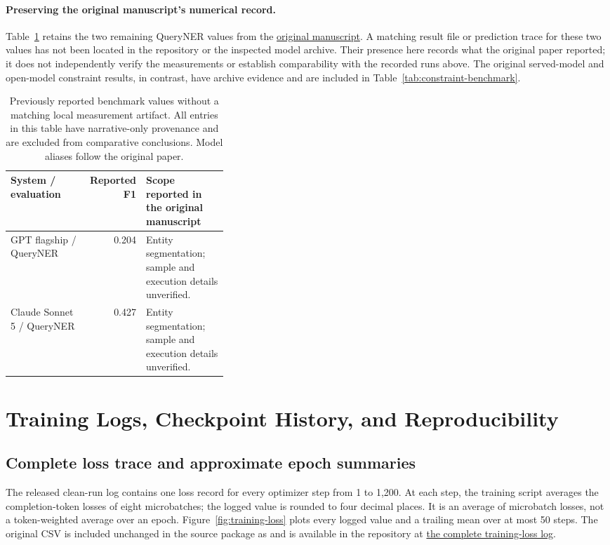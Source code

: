 \paragraph{Preserving the original manuscript's numerical record.}
Table~\ref{tab:original-results} retains the two remaining QueryNER values from the \href{https://github.com/arghya05/commercecore/blob/09c65f3/paper/commercecore_paper.tex}{original manuscript}. A matching result file or prediction trace for these two values has not been located in the repository or the inspected model archive. Their presence here records what the original paper reported; it does not independently verify the measurements or establish comparability with the recorded runs above. The original served-model and open-model constraint results, in contrast, have archive evidence and are included in Table~\ref{tab:constraint-benchmark}.

\begin{table}[htbp]
\centering\small
\caption{Previously reported benchmark values without a matching local measurement artifact. All entries in this table have narrative-only provenance and are excluded from comparative conclusions. Model aliases follow the original paper.}
\label{tab:original-results}
\begin{tabularx}{\linewidth}{@{}p{0.36\linewidth}rX@{}}
\toprule
System / evaluation & Reported F1 & Scope reported in the original manuscript \\
\midrule
GPT flagship / QueryNER & 0.204 & Entity segmentation; sample and execution details unverified. \\
Claude Sonnet 5 / QueryNER & 0.427 & Entity segmentation; sample and execution details unverified. \\
\bottomrule
\end{tabularx}
\end{table}

\section{Training Logs, Checkpoint History, and Reproducibility}
\label{app:training-logs}
\subsection{Complete loss trace and approximate epoch summaries}
The released clean-run log contains one loss record for every optimizer step from 1 to 1,200. At each step, the training script averages the completion-token losses of eight microbatches; the logged value is rounded to four decimal places. It is an average of microbatch losses, not a token-weighted average over an epoch. Figure~\ref{fig:training-loss} plots every logged value and a trailing mean over at most 50 steps. The original CSV is included unchanged in the source package as  and is available in the repository at \href{https://github.com/arghya05/commercecore/blob/main/train/results_multitask_clean/multitask_training_loss_log.csv}{the complete training-loss log}.

